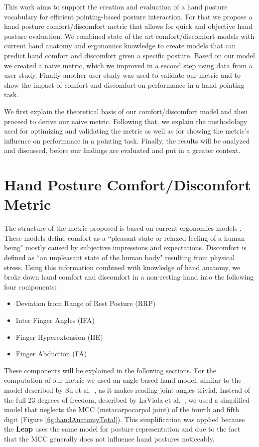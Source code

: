 \documentclass{sig-alternate-05-2015}
\begin{document}
This work aims to support the creation and evaluation of a hand posture vocabulary for efficient pointing-based posture interaction. For that we propose a hand posture comfort/discomfort metric that allows for quick and objective hand posture evaluation. We combined state of the art comfort/discomfort models with current hand anatomy and ergonomics knowledge to create models that can predict hand comfort and discomfort given a specific posture. Based on our model we created a naive metric, which we improved in a second step using data from a user study. Finally another user study was used to validate our metric and to show the impact of comfort and discomfort on performance in a hand pointing task.

We first explain the theoretical basis of our comfort/discomfort model and then proceed to derive our naive metric. Following that, we explain the methodology used for optimizing and validating the metric as well as for showing the metric's influence on performance in a pointing task. Finally, the results will be analyzed and discussed, before our findings are evaluated and put in a greater context.


\section{Hand Posture Comfort/Discomfort Metric}
The structure of the metric proposed is based on current ergonomics models \cite{vink2012editorial}. These models define comfort as a ``pleasant state or relaxed feeling of a human being" mostly caused by subjective impressions and expectations. Discomfort is defined as ``an unpleasant state of the human body" resulting from physical stress. Using this information combined with knowledge of hand anatomy, we broke down hand comfort and discomfort in a non-resting hand into the following four components: 

\begin{itemize}
	\item Deviation from Range of Rest Posture (RRP)
	\item Inter Finger Angles (IFA)
	\item Finger Hyperextension (HE)
	\item Finger Abduction (FA)
\end{itemize}

These components will be explained in the following sections. For the computation of our metric we used an angle based hand model, similar to the model described by Su et al.~\cite{su1994logical}, as it makes reading joint angles trivial. Instead of the full 23 degrees of freedom, described by LaViola et al.~\cite{laviola1999survey}, we used a simplified model that neglects the MCC (metacarpocarpal joint) of the fourth and fifth digit (Figure \ref{fig:handAnatomyTotal}). This simplification was applied because the \textbf{Leap} uses the same model for posture representation and due to the fact that the MCC generally does not influence hand postures noticeably.
\end{document}
